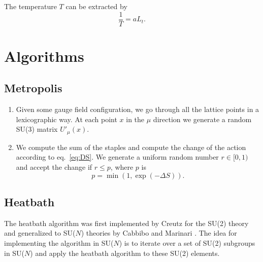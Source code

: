 \documentclass[12pt,a4paper]{article}
\begin{document}
	The temperature $T$ can be extracted by
	\begin{equation}
	\frac{1}{T}= a L_t .
\end{equation}	 
\section{Algorithms}



\subsection{Metropolis}
\begin{enumerate}
	\item Given some gauge field configuration, we go through all the lattice points in a lexicographic way. At each point $x$ in the $\mu$ direction we generate a random SU(3) matrix $U'_{\mu}(x)$.
	
	\item We compute the sum of the staples and compute the change of the action according to eq.\ \eqref{eq:DS}. We generate a uniform random number $r\in [0,1)$ and accept the change if $r \leq p$, where $p$ is
	\begin{equation}
		p = \min (1, \exp(-\Delta S)).
\end{equation}	 
\end{enumerate}

\subsection{Heatbath}
The heatbath algorithm was first implemented by Creutz for the SU(2) theory \cite{creutz1980} and generalized to SU($N$) theories by Cabbibo and Marinari \cite{cabbibo1982}. The idea for implementing the algorithm in SU($N$) is to iterate over a set of SU(2) subgroups in SU($N$) and apply the heatbath algorithm to these SU(2) elements. 
\end{document}
